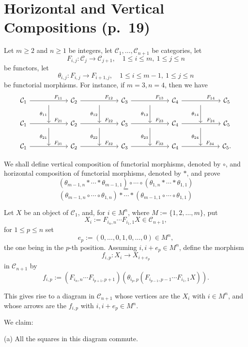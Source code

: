 \documentclass[12pt]{article}
\theoremstyle{remark}
\theoremstyle{definition}
\newcommand{\n}{\noindent}
\newcommand{\C}{\mathcal C}
\begin{document}
\section{Horizontal and Vertical Compositions (p.~19)} %
%
Let $m\ge2$ and $n\ge1$ be integers, let $\C_1,\dots,\C_{n+1}$ be categories, let 
$$
F_{i,j}:\C_j\to\C_{j+1},\quad1\le i\le m,\ 1\le j\le n
$$
be functors, let 
$$
\theta_{i,j}:F_{i,j}\to F_{i+1,j},\quad1\le i\le m-1,\ 1\le j\le n
$$
be functorial morphisms. For instance, if $m=3,n=4$, then we have 
$$
\begin{tikzcd}
%
\C_1\ar{rr}{}[near end]{F_{11}}&\ar{d}[swap]{\theta_{11}}&\C_2\ar{rr}{}[near end]{F_{12}}&\ar{d}[swap]{\theta_{12}}&\C_3\ar{rr}{}[near end]{F_{13}}&\ar{d}[swap]{\theta_{13}}&\C_4\ar{rr}{}[near end]{F_{14}}&\ar{d}[swap]{\theta_{14}}&\C_5\\ 
%
\C_1\ar{rr}{}[near end]{F_{21}}&{}\ar{d}[swap]{\theta_{21}}&\C_2\ar{rr}{}[near end]{F_{22}}&{}\ar{d}[swap]{\theta_{22}}&\C_3\ar{rr}{}[near end]{F_{23}}&{}\ar{d}[swap]{\theta_{23}}&\C_4\ar{rr}{}[near end]{F_{24}}&{}\ar{d}[swap]{\theta_{24}}&\C_5\\ 
%
\C_1\ar{rr}{}[near end]{F_{31}}&{}&\C_2\ar{rr}{}[near end]{F_{32}}&{}&\C_3\ar{rr}{}[near end]{F_{33}}&{}&\C_4\ar{rr}{}[near end]{F_{34}}&{}&\C_5.
\end{tikzcd}
$$ 

We shall define vertical composition of functorial morphisms, denoted by $\circ$, and horizontal composition of functorial morphisms, denoted by $*$, and prove 
$$
(\theta_{m-1,n}*\cdots*\theta_{m-1,1})\circ\cdots\circ(\theta_{1,n}*\cdots*\theta_{1,1})
$$ 
$$=$$
$$
(\theta_{m-1,n}\circ\cdots\circ\theta_{1,n})*\cdots*(\theta_{m-1,1}\circ\cdots\circ\theta_{1,1})
$$

Let $X$ be an object of $\C_1$, and, for $i\in M^n$, where $M:=\{1,2,\dots,m\}$, put 
$$
X_i:=F_{i_n,n}\cdots F_{i_1,1}X\in\C_{n+1},
$$
for $1\le p\le n$ set 
$$
e_p:=(0,\dots,0,1,0,\dots,0)\in M^n,
$$
the one being in the $p$-th position. Assuming $i,i+e_p\in M^n$, define the morphism 
$$
f_{i,p}:X_i\to X_{i+e_p}
$$
in $\C_{n+1}$ by 
$$
f_{i,p}:=(F_{i_n,n}\cdots F_{i_{p+1},p+1})(\theta_{i_p,p}(F_{i_{p-1},p-1}\cdots F_{i_1,1}X)).
$$

This gives rise to a diagram in $\C_{n+1}$ whose vertices are the $X_i$ with $i\in M^n$, and whose arrows are the $f_{i,p}$ with $i,i+e_p\in M^n$. 

We claim: 

\n(a) All the squares in this diagram commute. 
\end{document}
